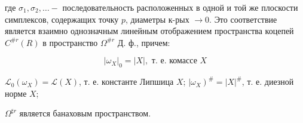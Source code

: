 \documentclass[10pt]{article}
\begin{document}
где $\sigma_{1}, \sigma_{2}, \ldots-$ последовательность расположенных в одной и той же плоскости симплексов, содержащих точку $p$, диаметры к-рых $\rightarrow 0$. Это соответствие является взаимно однозначным линейным отображением пространства коцепей $C^{\# r}(R)$ в пространство $\Omega^{\# r}$ Д. ф., причем:



\[

\left|\omega_{X}\right|_{0}=|X|, \text { т. е. комассе } X

\]



$\mathscr{L}_{0}\left(\omega_{X}\right)=\mathscr{L}(X)$, т. е. константе Липшица $X$; $\left.\mid \omega_{X}\right)^{\#}=|X|^{\#}$, т. е. диезной норме $X$;



$\Omega^{\sharp r}$ является банаховым пространством.
\end{document}
